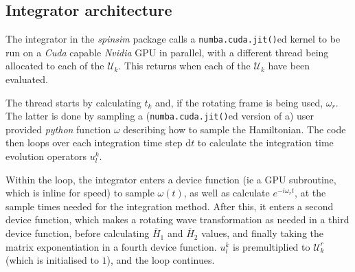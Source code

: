 \documentclass{jors}
\begin{document}

	\subsection{Integrator architecture}
		The integrator in the \emph{spinsim} package calls a \texttt{numba.cuda.jit()}ed kernel to be run on a \emph{Cuda} capable \emph{Nvidia} GPU in parallel, with a different thread being allocated to each of the \(\mathcal{U}_k\).
		This returns when each of the \(\mathcal{U}_k\) have been evaluated.
		
		The thread starts by calculating \(t_k\) and, if the rotating frame is being used, \(\omega_r\).
		The latter is done by sampling a (\texttt{numba.cuda.jit()}ed version of a) user provided \emph{python} function \(\omega\) describing how to sample the Hamiltonian.
		The code then loops over each integration time step \(\mathrm{d}t\) to calculate the integration time evolution operators \(u^k_l\).
		
		Within the loop, the integrator enters a device function (ie a GPU subroutine, which is inline for speed) to sample \(\omega(t)\), as well as calculate \(e^{-i \omega_r t}\), at the sample times needed for the integration method.
		After this, it enters a second device function, which makes a rotating wave transformation as needed in a third device function, before calculating \(\overline{H}_1\) and \(\overline{H}_2\) values, and finally taking the matrix exponentiation in a fourth device function.
		\(u^k_l\) is premultiplied to \(\mathcal{U}^r_k\) (which is initialised to \(1\)), and the loop continues.
		
\end{document}

